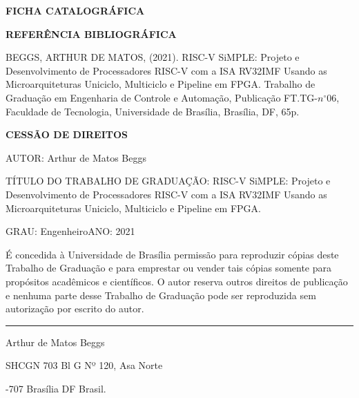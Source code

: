 \noindent \textbf{FICHA CATALOGRÁFICA}

\noindent %

\noindent \medskip{}


\noindent \textbf{REFERÊNCIA BIBLIOGRÁFICA}

BEGGS, ARTHUR DE MATOS, (2021). RISC-V SiMPLE: Projeto e Desenvolvimento de
Processadores RISC-V com a ISA RV32IMF Usando as Microarquiteturas Uniciclo,
Multiciclo e Pipeline em FPGA.  Trabalho de Graduação em Engenharia de Controle
e Automação, Publicação FT.TG-$n^{\circ}06$, Faculdade de Tecnologia,
Universidade de Brasília, Brasília, DF, 65p.


\noindent \textbf{CESSÃO DE DIREITOS}

\noindent AUTOR: Arthur de Matos Beggs

\noindent TÍTULO DO TRABALHO DE GRADUAÇÃO: RISC-V SiMPLE: Projeto e Desenvolvimento de
Processadores RISC-V com a ISA RV32IMF Usando as Microarquiteturas Uniciclo,
Multiciclo e Pipeline em FPGA.

\noindent \medskip{}


\noindent GRAU: Engenheiro\hfill{}ANO: 2021\hfill{}

\noindent \medskip{}


É concedida à Universidade de Brasília permissão para reproduzir cópias
deste Trabalho de Graduação e para emprestar ou vender tais cópias
somente para propósitos acadêmicos e científicos. O autor reserva
outros direitos de publicação e nenhuma parte desse Trabalho de Graduação
pode ser reproduzida sem autorização por escrito do autor.

\noindent \bigskip{}


\noindent \rule[0.5ex]{.4\columnwidth}{1pt}

\noindent Arthur de Matos Beggs

\noindent SHCGN 703 Bl G Nº 120, Asa Norte

-707 Brasília \textendash{} DF \textendash{} Brasil.
